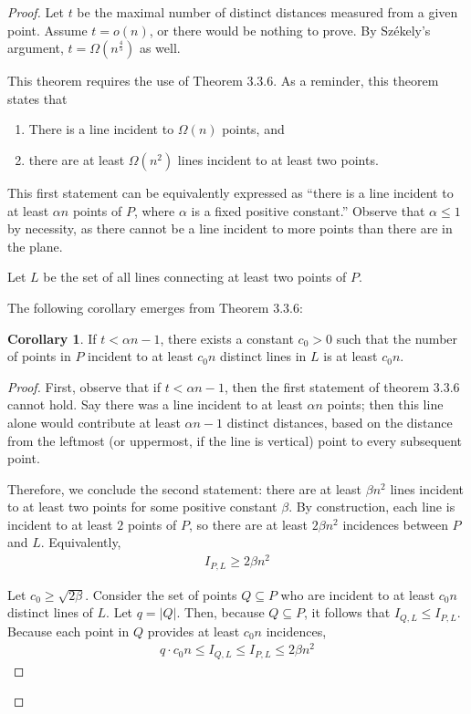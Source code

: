 \documentclass{scrippsthesisclass}
\theoremstyle{definition}
\newtheorem{corollary}[theorem]{Corollary}
\begin{document}
\begin{proof}
Let $t$ be the maximal number of distinct distances measured from a given point. Assume $t = o(n)$, or there would be nothing to prove. 
By Sz\'{e}kely's argument, $t = \Omega(n^{\frac{4}{5}})$ as well. 

This theorem requires the use of Theorem 3.3.6. 
As a reminder, this theorem states that 
\begin{enumerate}
    \item There is a line incident to $\Omega(n)$ points, and 
    \item there are at least $\Omega(n^2)$ lines incident to at least two points. 
\end{enumerate}

This first statement can be equivalently expressed as ``there is a line incident to at least $\alpha n$ points of $P$, where $\alpha$ is a fixed positive constant.''
Observe that $\alpha \leq 1$ by necessity, as there cannot be a line incident to more points than there are in the plane. 

Let $L$ be the set of all lines connecting at least two points of $P$. 

The following corollary emerges from Theorem 3.3.6:
\begin{corollary}
    If $t < \alpha n - 1$, there exists a constant $c_0 > 0$ such that the number of points in $P$ incident to at least $c_0 n $ distinct lines in $L$ is at least $c_0 n$.
\end{corollary}

\begin{proof}
    First, observe that if $t < \alpha n - 1$, then the first statement of theorem 3.3.6 cannot hold.
    Say there was a line incident to at least $\alpha n$ points; then this line alone would contribute at least $\alpha n - 1$ distinct distances, based on the distance from the leftmost (or uppermost, if the line is vertical) point to every subsequent point. 
    
    Therefore, we conclude the second statement: there are at least $\beta n^2$ lines incident to at least two points  for some positive constant $\beta$.
    By construction, each line is incident to at least $2$ points of $P$, so there are at least $2\beta n^2$ incidences between $P$ and $L$. Equivalently, 
    \begin{align}
        I_{P, L} \geq 2\beta n^2
    \end{align}

    Let $c_0 \geq \sqrt{2\beta}$. 
    Consider the set of points $Q \subseteq P$ who are incident to at least $c_0 n$ distinct lines of $L$. 
    Let $q = |Q|$.
    Then, because $Q \subseteq P$, it follows that $I_{Q,L} \leq I_{P, L}$.
    Because each point in $Q$ provides at least $c_0n$ incidences, 
    \begin{align}
        q \cdot c_0 n \leq I_{Q, L} \leq I_{P, L} \leq 2\beta n^2
    \end{align}
    

\end{proof}
\end{proof}
\end{document}
